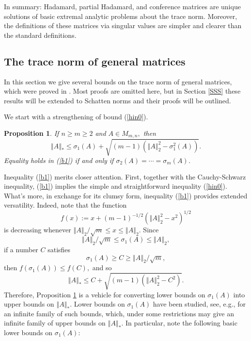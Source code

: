 \documentclass[12pt]{article}%
\newtheorem{proposition}[theorem]{Proposition}
\begin{document}
In summary: Hadamard, partial Hadamard, and conference matrices are unique
solutions of basic extremal analytic problems about the trace norm. Moreover,
the definitions of these matrices via singular values are simpler and clearer
than the standard definitions.

\subsection{\label{secGM}The trace norm of general matrices}

In this section we give several bounds on the trace norm of general matrices,
which were proved in \cite{Nik07i}. Most proofs are omitted here, but in
Section \ref{SSS} these results will be extended to Schatten norms and their
proofs will be outlined.\medskip

We start with a strengthening of bound (\ref{hin0}).

\begin{proposition}
\label{p1}If $n\geq m\geq2$ and $A\in M_{m,n},$ then%
\begin{equation}
\left\Vert A\right\Vert _{\ast}\leq\sigma_{1}\left(  A\right)  +\sqrt{\left(
m-1\right)  \left(  \left\Vert A\right\Vert _{2}^{2}-\sigma_{1}^{2}\left(
A\right)  \right)  }. \label{b1}%
\end{equation}
Equality holds in (\ref{b1}) if and only if $\sigma_{2}\left(  A\right)
=\cdots=\sigma_{m}\left(  A\right)  $.
\end{proposition}

Inequality (\ref{b1}) merits closer attention. First, together with the
Cauchy-Schwarz inequality, (\ref{b1}) implies the simple and straightforward
inequality (\ref{hin0}). What's more, in exchange for its clumsy form,
inequality (\ref{b1}) provides extended versatility. Indeed, note that the
function
\[
f\left(  x\right)  :=x+\left(  m-1\right)  ^{-1/2}\left(  \left\Vert
A\right\Vert _{2}^{2}-x^{2}\right)  ^{1/2}%
\]
is decreasing whenever $\left\Vert A\right\Vert _{2}/\sqrt{m}\leq
x\leq\left\Vert A\right\Vert _{2}.$ Since
\[
\left\Vert A\right\Vert _{2}/\sqrt{m}\leq\sigma_{1}\left(  A\right)
\leq\left\Vert A\right\Vert _{2},
\]
if a number $C$ satisfies
\[
\sigma_{1}\left(  A\right)  \geq C\geq\left\Vert A\right\Vert _{2}/\sqrt{m},
\]
then $f\left(  \sigma_{1}\left(  A\right)  \right)  \leq f\left(  C\right)  ,$
and so
\[
\left\Vert A\right\Vert _{\ast}\leq C+\sqrt{\left(  m-1\right)  \left(
\left\Vert A\right\Vert _{2}^{2}-C^{2}\right)  }.
\]
Therefore, Proposition \ref{p1} is a vehicle for converting lower bounds on
$\sigma_{1}\left(  A\right)  $ into upper bounds on $\left\Vert A\right\Vert
_{\ast}.$ Lower bounds on $\sigma_{1}\left(  A\right)  $ have been studied,
see, e.g., \cite{Nik07a} for an infinite family of such bounds, which, under
some restrictions may give an infinite family of upper bounds on $\left\Vert
A\right\Vert _{\ast}.$ In particular, note the following basic lower bounds on
$\sigma_{1}\left(  A\right)  :$
\end{document}
